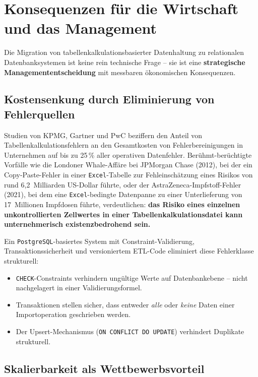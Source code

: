 \documentclass[12pt,a4paper]{report}
\theoremstyle{definition}
\theoremstyle{remark}
\newcommand{\excel}{\texttt{Excel}}
\newcommand{\pg}{\texttt{PostgreSQL}}
\newcommand{\code}[1]{\texttt{#1}}
\begin{document}
\section{Konsequenzen für die Wirtschaft und das Management}

Die Migration von tabellenkalkulationsbasierter Datenhaltung zu
relationalen Datenbanksystemen ist keine rein technische Frage --
sie ist eine \textbf{strategische Managemententscheidung} mit
messbaren ökonomischen Konsequenzen.

\subsection{Kostensenkung durch Eliminierung von Fehlerquellen}

Studien von KPMG, Gartner und PwC beziffern den Anteil von
Tabellenkalkulationsfehlern an den Gesamtkosten von Fehlerbereinigungen
in Unternehmen auf bis zu 25\,\% aller operativen Datenfehler.
Berühmt-berüchtigte Vorfälle wie die Londoner Whale-Affäre bei
JPMorgan Chase (2012), bei der ein Copy-Paste-Fehler in einer
\excel-Tabelle zur Fehleinschätzung eines Risikos von rund
6{,}2~Milliarden US-Dollar führte, oder der AstraZeneca-Impfstoff-Fehler
(2021), bei dem eine \excel-bedingte Datenpanne zu einer Unterlieferung
von 17~Millionen Impfdosen führte, verdeutlichen: \textbf{das Risiko
eines einzelnen unkontrollierten Zellwertes in einer
Tabellenkalkulationsdatei kann unternehmerisch existenzbedrohend sein.}

Ein \pg-basiertes System mit Constraint-Validierung,
Transaktionssicherheit und versioniertem ETL-Code eliminiert diese
Fehlerklasse strukturell:
\begin{itemize}[leftmargin=1.5em, itemsep=2pt]
  \item \code{CHECK}-Constraints verhindern ungültige Werte auf
        Datenbankebene -- nicht nachgelagert in einer Validierungsformel.
  \item Transaktionen stellen sicher, dass entweder \emph{alle} oder
        \emph{keine} Daten einer Importoperation geschrieben werden.
  \item Der Upsert-Mechanismus (\code{ON CONFLICT DO UPDATE}) verhindert
        Duplikate strukturell.
\end{itemize}

\subsection{Skalierbarkeit als Wettbewerbsvorteil}
\end{document}
